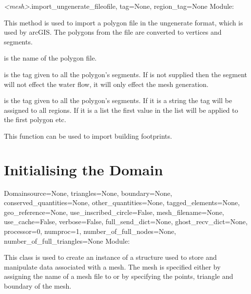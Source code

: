 \documentclass{manual}
\begin{document}
\begin{methoddesc}{\emph{<mesh>}.import_ungenerate_file}{ofile,
                                                         tag=None,
                                                         region_tag=None}
Module: 

This method is used to import a polygon file in the ungenerate format,
which is used by arcGIS. The polygons from the file are converted to
vertices and segments.

 is the name of the polygon file.

 is the tag given to all the polygon's segments.
If  is not supplied then the segment will not effect the water
flow, it will only effect the mesh generation.

 is the tag given to all the polygon's segments.  If
it is a string the tag will be assigned to all regions.  If it
is a list the first value in the list will be applied to the first
polygon etc.

This function can be used to import building footprints.
\end{methoddesc}


\section{Initialising the Domain}
\label{sec:initialising the domain}

\begin{classdesc}{Domain}{source=None,
                          triangles=None,
                          boundary=None,
                          conserved_quantities=None,
                          other_quantities=None,
                          tagged_elements=None,
                          geo_reference=None,
                          use_inscribed_circle=False,
                          mesh_filename=None,
                          use_cache=False,
                          verbose=False,
                          full_send_dict=None,
                          ghost_recv_dict=None,
                          processor=0,
                          numproc=1,
                          number_of_full_nodes=None,
                          number_of_full_triangles=None}
Module: 

This class is used to create an instance of a structure used to
store and manipulate data associated with a mesh. The mesh is
specified either by assigning the name of a mesh file to
 or by specifying the points, triangle and boundary of the
mesh.
\end{classdesc}
\end{document}

